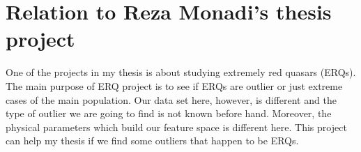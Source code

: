 \documentclass[usenatbib,a4paper,fleqn]{article}
\begin{document}
\section*{Relation to Reza Monadi's thesis project}
One of the projects in my thesis is about studying extremely
 red quasars (ERQs). The main purpose of ERQ project is to see if
  ERQs are outlier or just extreme cases of the main population. 
  Our data set here, however, is different and the type of outlier 
  we are going to find is not known before hand. Moreover, the physical 
  parameters which build our feature space is different here. 
  This project can help my thesis if we find some outliers that happen to be ERQs. 
\end{document}
